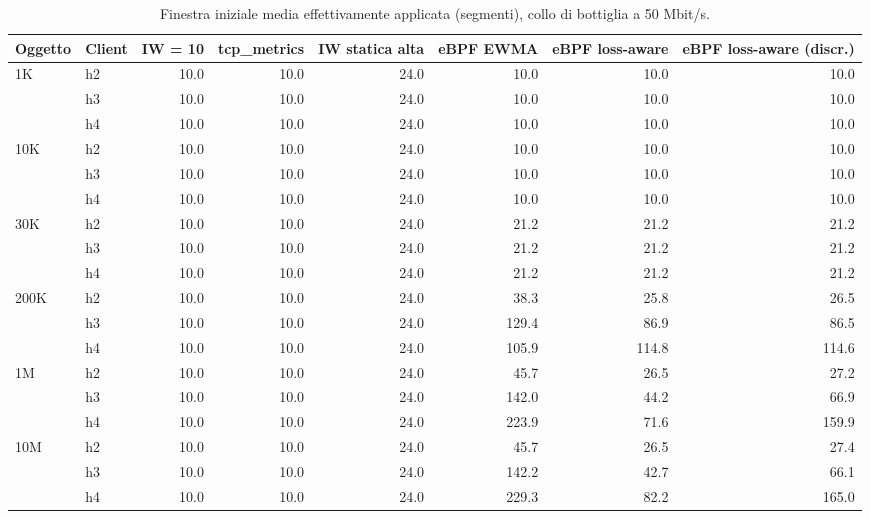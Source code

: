 \begin{table}[htbp]
  \centering
  \caption{Finestra iniziale media effettivamente applicata (segmenti), collo di bottiglia a 50 Mbit/s.}
  \label{tab:iw-50}
  \begin{tabular}{llrrrrrr}
    \toprule
    Oggetto & Client & IW = 10 & tcp\_metrics & IW statica alta & eBPF EWMA & eBPF loss-aware & eBPF loss-aware (discr.) \\
    \midrule
    1K & h2 & 10.0 & 10.0 & 24.0 & 10.0 & 10.0 & 10.0 \\
     & h3 & 10.0 & 10.0 & 24.0 & 10.0 & 10.0 & 10.0 \\
     & h4 & 10.0 & 10.0 & 24.0 & 10.0 & 10.0 & 10.0 \\
    \addlinespace
    10K & h2 & 10.0 & 10.0 & 24.0 & 10.0 & 10.0 & 10.0 \\
     & h3 & 10.0 & 10.0 & 24.0 & 10.0 & 10.0 & 10.0 \\
     & h4 & 10.0 & 10.0 & 24.0 & 10.0 & 10.0 & 10.0 \\
    \addlinespace
    30K & h2 & 10.0 & 10.0 & 24.0 & 21.2 & 21.2 & 21.2 \\
     & h3 & 10.0 & 10.0 & 24.0 & 21.2 & 21.2 & 21.2 \\
     & h4 & 10.0 & 10.0 & 24.0 & 21.2 & 21.2 & 21.2 \\
    \addlinespace
    200K & h2 & 10.0 & 10.0 & 24.0 & 38.3 & 25.8 & 26.5 \\
     & h3 & 10.0 & 10.0 & 24.0 & 129.4 & 86.9 & 86.5 \\
     & h4 & 10.0 & 10.0 & 24.0 & 105.9 & 114.8 & 114.6 \\
    \addlinespace
    1M & h2 & 10.0 & 10.0 & 24.0 & 45.7 & 26.5 & 27.2 \\
     & h3 & 10.0 & 10.0 & 24.0 & 142.0 & 44.2 & 66.9 \\
     & h4 & 10.0 & 10.0 & 24.0 & 223.9 & 71.6 & 159.9 \\
    \addlinespace
    10M & h2 & 10.0 & 10.0 & 24.0 & 45.7 & 26.5 & 27.4 \\
     & h3 & 10.0 & 10.0 & 24.0 & 142.2 & 42.7 & 66.1 \\
     & h4 & 10.0 & 10.0 & 24.0 & 229.3 & 82.2 & 165.0 \\
    \bottomrule
  \end{tabular}
\end{table}
